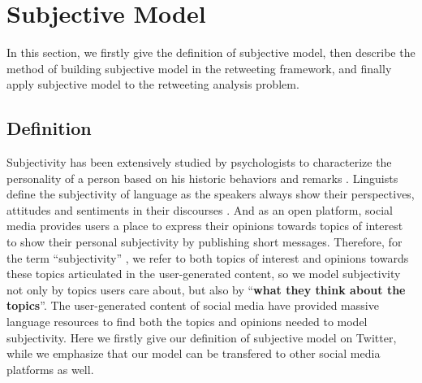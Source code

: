 \documentclass{acm_proc_article-sp}
\begin{document}
\section{Subjective Model}
\label{subjectivemodel}
In this section, we firstly give the definition of subjective model, then describe the method of building subjective model in the retweeting framework, and finally apply subjective model to the retweeting analysis problem.
\subsection{Definition}
\label{definition}
Subjectivity has been extensively studied by psychologists to characterize the personality of a person based on his historic behaviors and remarks \cite{Engbert2007}. 
Linguists define the subjectivity of language as the speakers always show their perspectives, attitudes and sentiments in their discourses \cite{stein2005subjectivity}.
And as an open platform, social media provides users a place to express their opinions towards topics of interest to show their personal subjectivity by publishing short messages. 
Therefore, for the term ``subjectivity'' , we refer to both topics of interest and opinions towards these topics articulated in the user-generated content, so we model subjectivity not only by topics users care about, but also by ``\textbf{what they think about the topics}''.
The user-generated content of social media have provided massive language resources to find both the topics and opinions needed to model subjectivity. 
Here we firstly give our definition of subjective model on Twitter, while we emphasize that our model can be transfered to other social media platforms as well.
\end{document}
